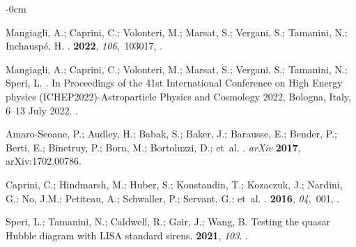 \documentclass[universe,article,accept,moreauthors,pdftex]{Definitions/mdpi}
\begin{document}
\begin{adjustwidth}{-\extralength}{0cm}
\begin{thebibliography}{999}
Mangiagli, A.; Caprini, C.; Volonteri, M.; Marsat, S.; Vergani, S.; Tamanini,
  N.; Inchausp\'e, H.
.
 {\bf 2022}, {\em 106},~103017,
{\href{https://doi.org/10.1103/PhysRevD.106.103017}{}}.

Mangiagli, A.; Caprini, C.; Volonteri, M.; Marsat, S.; Vergani, S.; Tamanini,
  N.; Speri, L.
.  In Proceedings of the  41st International Conference on High Energy physics (ICHEP2022)-Astroparticle Physics and Cosmology 2022, Bologna, Italy, 6--13 July 2022.
\newblock
{\href{https://doi.org/10.22323/1.414.0125}{}}.

Amaro-Seoane, P.; Audley, H.; Babak, S.; Baker, J.; Barausse, E.; Bender, P.; Berti, E.; Binetruy, P.; Born, M.; Bortoluzzi, D.;  et~al.
. \emph{arXiv} {\bf 2017}, arXiv:1702.00786.

Caprini, C.; Hindmarsh, M.; Huber, S.; Konstandin, T.; Kozaczuk, J.; Nardini, G.; No, J.M.; Petiteau, A.; Schwaller, P.; Servant, G.;  et~al.
.
 {\bf 2016}, {\em 04},~001,
{\href{https://doi.org/10.1088/1475-7516/2016/04/001}{}}.

Speri, L.; Tamanini, N.; Caldwell, R.; Gair, J.; Wang, B.
\newblock Testing the quasar Hubble diagram with LISA standard sirens.
 {\bf 2021}, {\em 103}.
\newblock
 {\href{https://doi.org/10.1103/PhysRevD.103.083526}{}}.


\end{thebibliography}
\end{adjustwidth}
\end{document}
